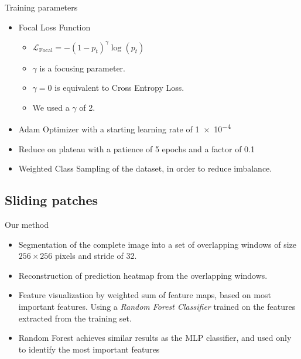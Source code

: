 \begin{frame}{Training parameters}
    \begin{itemize}
        \item Focal Loss Function  
        \begin{itemize}
            \item $\mathcal{L}_{\text{Focal}} = -(1 - p_t)^\gamma \log{(p_t)} $
            \item $\gamma$ is a focusing parameter.
            \item $\gamma = 0$ is equivalent to Cross Entropy Loss.
            \item We used a $\gamma$ of \num{2}.
        \end{itemize}

        \item Adam Optimizer with a starting learning rate of \num{1e-4}
        \item Reduce on plateau with a patience of 5 epochs and a factor of \num{0.1}
        \item Weighted Class Sampling of the dataset, in order to reduce imbalance.
    \end{itemize}
\end{frame}

\subsection{Sliding patches}

\begin{frame}{Our method}
    \begin{itemize}
        \item Segmentation of the complete image into a set of overlapping windows of size $256 \times 256$ pixels and stride of \SI{32}{\pixel}.
        \item Reconstruction of prediction heatmap from the overlapping windows.
        \item Feature visualization by weighted sum of feature maps, based on most important features. Using a \emph{Random Forest Classifier} trained on the features extracted from the training set.
        \item Random Forest achieves similar results as the MLP classifier, and used only to identify the most important features
    \end{itemize}
\end{frame}
